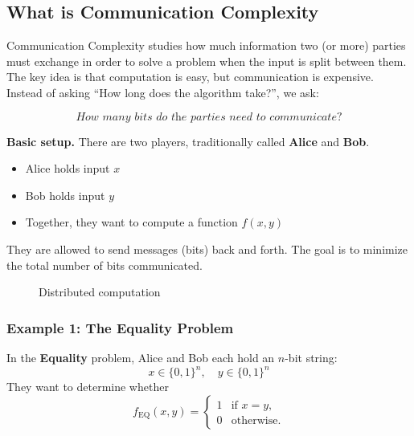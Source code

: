 \subsection*{What is Communication Complexity}

Communication Complexity studies how much information two (or more) parties must exchange in order to solve a problem when the input is split between them. The key idea is that computation is easy, but communication is expensive. Instead of asking ``How long does the algorithm take?'', we ask:  

\[
\textit{How many bits do the parties need to communicate?}
\]



\textbf{Basic setup.}  
There are two players, traditionally called \textbf{Alice} and \textbf{Bob}.  
\begin{itemize}
    \item Alice holds input $x$
    \item Bob holds input $y$
    \item Together, they want to compute a function $f(x,y)$
\end{itemize}
They are allowed to send messages (bits) back and forth. The goal is to minimize the total number of bits communicated.\\[12pt]

\begin{figure}[H]
\centering
{}
\caption{Distributed computation}
\end{figure}


\newpage
\subsubsection*{Example 1: The Equality Problem}

In the \textbf{Equality} problem, Alice and Bob each hold an $n$-bit string:
\[
x \in \{0,1\}^n, \quad y \in \{0,1\}^n
\]
They want to determine whether
\[
f_{\text{EQ}}(x,y) =
\begin{cases}
1 & \text{if } x = y,\\
0 & \text{otherwise}.
\end{cases}
\]

